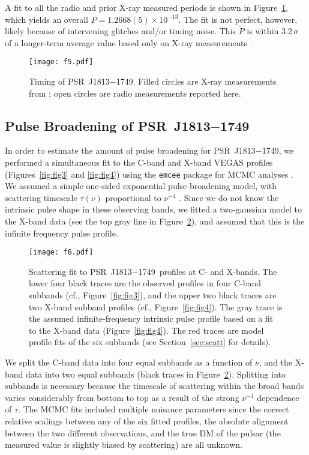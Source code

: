 \documentclass[twocolumn]{aastex62}
\newcommand\psr{PSR~J1813$-$1749}
\begin{document}
A fit to all the radio and prior X-ray measured periods is shown
in Figure~\ref{fig:fig5}, which yields an overall $\dot P =
1.2668(5)\times10^{-13}$.  The fit is not perfect, however, likely
because of intervening glitches and/or timing noise. This $\dot P$
is within 3.2\,$\sigma$ of a longer-term average value based only
on X-ray measurements \citep{ho20}.

\begin{figure}
\centerline{
\texttt{[image: f5.pdf]}
}
\caption{Timing of \psr.  Filled circles are X-ray measurements
from \citet{hal12}; open circles are radio measurements reported
here.
}
\label{fig:fig5}
\end{figure}

\subsection{Pulse Broadening of \psr\ \label{sec:scatt}}

In order to estimate the amount of pulse broadening for \psr, we
performed a simultaneous fit to the C-band and X-band VEGAS profiles
(Figures~\ref{fig:fig3} and \ref{fig:fig4}) using the {\tt emcee}
package for MCMC analyses \citep{for13}. We assumed a simple one-sided
exponential pulse broadening model, with scattering timescale
$\tau(\nu)$ proportional to $\nu^{-4}$ \citep{osw21}.  Since
we do not know the intrinsic pulse shape in these observing bands,
we fitted a two-gaussian model to the X-band data (see the top gray
line in Figure~\ref{fig:fig6}), and assumed that this is the infinite
frequency pulse profile.

\begin{figure}
\centerline{
\texttt{[image: f6.pdf]}
}
\caption{Scattering fit to \psr\ profiles at C- and X-bands.  The
lower four black traces are the observed profiles in four C-band
subbands (cf., Figure~\ref{fig:fig3}), and the upper two black
traces are two X-band subband profiles (cf., Figure~\ref{fig:fig4}).
The gray trace is the assumed infinite-frequency intrinsic pulse
profile based on a fit to the X-band data (Figure~\ref{fig:fig4}).
The red traces are model profile fits of the six subbands (see
Section~\ref{sec:scatt} for details).
}
\label{fig:fig6}
\end{figure}

We split the C-band data into four equal subbands as a function of
$\nu$, and the X-band data into two equal subbands (black traces
in Figure~\ref{fig:fig6}). Splitting into subbands is necessary
because the timescale of scattering within the broad bands varies
considerably from bottom to top as a result of the strong $\nu^{-4}$
dependence of $\tau$. The MCMC fits included multiple nuisance
parameters since the correct relative scalings between any of the
six fitted profiles, the absolute alignment between the two different
observations, and the true DM of the pulsar (the measured value is
slightly biased by scattering) are all unknown.
\end{document}
